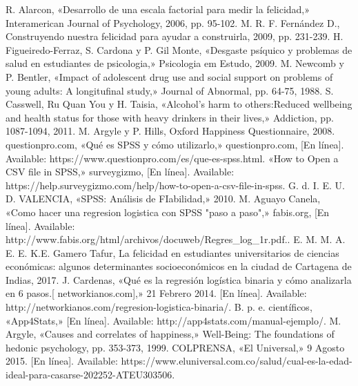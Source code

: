 \documentclass[conference]{IEEEtran}
\begin{document}
\begin{thebibliography}{99}
R. Alarcon, «Desarrollo de una escala factorial para medir la felicidad,» Interamerican Journal of Psychology, 2006, pp. 95-102.
M. R. F. Fernández D., Construyendo nuestra felicidad para ayudar a construirla, 2009, pp. 231-239.
H. Figueiredo-Ferraz, S. Cardona y P. Gil Monte, «Desgaste psíquico y problemas de salud en estudiantes de psicologia,» Psicologia em Estudo, 2009. 
M. Newcomb y P. Bentler, «Impact of adolescent drug use and social support on problems of young adults: A longitufinal study,» Journal of Abnormal, pp. 64-75, 1988. 
S. Casswell, Ru Quan You y H. Taisia, «Alcohol's harm to others:Reduced wellbeing and health status for those with heavy drinkers in their lives,» Addiction, pp. 1087-1094, 2011. 
M. Argyle y P. Hills, Oxford Happiness Questionnaire, 2008. 
questionpro.com, «Qué es SPSS y cómo utilizarlo,» questionpro.com, [En línea]. Available: https://www.questionpro.com/es/que-es-spss.html.
«How to Open a CSV file in SPSS,» surveygizmo, [En línea]. Available: https://help.surveygizmo.com/help/how-to-open-a-csv-file-in-spss.
G. d. I. E. U. D. VALENCIA, «SPSS: Análisis de FIabilidad,» 2010.
M. Aguayo Canela, «Como hacer una regresion logistica con SPSS "paso a paso",» fabis.org, [En línea]. Available: http://www.fabis.org/html/archivos/docuweb/Regres\_log\_1r.pdf..
E. M. M. A. E. E. K.E. Gamero Tafur, La felicidad en estudiantes universitarios de ciencias económicas: algunos determinantes socioeconómicos en la ciudad de Cartagena de Indias, 2017. 
J. Cardenas, «Qué es la regresión logística binaria y cómo analizarla en 6 pasos.[ networkianos.com],» 21 Febrero 2014. [En línea]. Available: http://networkianos.com/regresion-logistica-binaria/.
B. p. e. científicos, «App4Stats,» [En línea]. Available: http://app4stats.com/manual-ejemplo/.
M. Argyle, «Causes and correlates of happiness,» Well-Being: The foundations of hedonic psychology, pp. 353-373, 1999. 
COLPRENSA, «El Universal,» 9 Agosto 2015. [En línea]. Available: https://www.eluniversal.com.co/salud/cual-es-la-edad-ideal-para-casarse-202252-ATEU303506.




\end{thebibliography}
\end{document}
